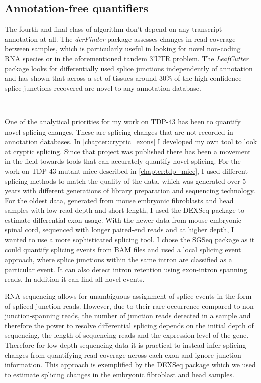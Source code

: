 \subsection{Annotation-free quantifiers}
The fourth and final class of algorithm don't depend on any transcript annotation at all. The \textit{derFinder} package \citep{ColladoTorres2015} assesses changes in read coverage between samples, which is particularly useful in looking for novel non-coding RNA species or in the aforementioned tandem 3'UTR problem. The \textit{LeafCutter} package \citep{Li2016} looks for differentially used splice junctions independently of annotation and has shown that across a set of tissues around 30\% of the high confidence splice junctions recovered are novel to any annotation database.


\






One of the analytical priorities for my work on TDP-43 has been to quantify novel splicing changes. These are splicing changes that are not recorded in annotation databases. In \autoref{chapter:cryptic_exons} I developed my own tool to look at cryptic splicing. Since that project was published there has been a movement in the field towards tools that can accurately quantify novel splicing. 
For the work on TDP-43 mutant mice described in \autoref{chapter:tdp_mice}, I used different splicing methods to match the quality of the data, which was generated over 5 years with different generations of library preparation and sequencing technology. For the oldest data, generated from mouse embryonic fibroblasts and head samples with low read depth and short length, I used the DEXSeq package to estimate differential exon usage.
With the newer data from mouse embryonic spinal cord, sequenced with longer paired-end reads and at higher depth, I wanted to use a more sophisticated splicing tool. 
I chose the SGSeq package as it could quantify splicing events from BAM files and used a local splicing event approach, where splice junctions within the same intron are classified as a particular event. It can also detect intron retention using exon-intron spanning reads. In addition it can find all novel events. 


RNA sequencing allows for unambiguous assignment of splice events in the form of spliced junction reads. 
However, due to their rare occurrence compared to non junction-spanning reads, the number of junction reads detected in a sample and therefore the power to resolve differential splicing depends on the initial depth of sequencing, the length of sequencing reads and the expression level of the gene. Therefore for low depth sequencing data it is practical to instead infer splicing changes from quantifying read coverage across each exon and ignore junction information. This approach is exemplified by the DEXSeq package \citep{Anders2012} which we used to estimate splicing changes in the embryonic fibroblast and head samples.

